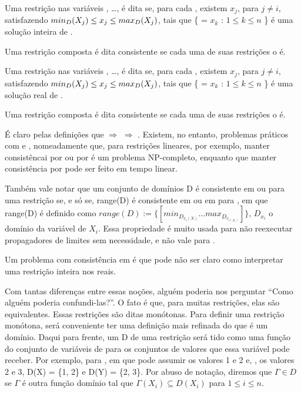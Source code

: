 \begin{definition}
  Uma restrição  nas variáveis , \dots,
   é dita  se, para cada
  , existem  $x_j$, para $j
  \neq i$, satisfazendo $min_D(\textit{$X_j$}) \leq x_j \leq
  max_D(\textit{$X_j$})$, tais que \{ = $x_k$ : $1 \leq k \leq
  n$ \} é uma solução inteira de .

  Uma restrição composta é dita \boundz{} consistente se cada uma de
  suas restrições o é.
\end{definition}

\begin{definition}
  Uma restrição  nas variáveis , \dots,
   é dita  se, para cada
  , existem  $x_j$, para $j \neq
  i$, satisfazendo $min_D(\textit{$X_j$}) \leq x_j \leq
  max_D(\textit{$X_j$})$, tais que \{ = $x_k$ : $1 \leq k \leq
  n$ \} é uma solução real de .

  Uma restrição composta é dita \boundr{} consistente se cada uma de
  suas restrições o é.
\end{definition}

É claro pelas definições que \boundd{} $\Rightarrow$ \boundz{}
$\Rightarrow$ \boundr. Existem, no entanto, problemas práticos com
\boundd{} e \boundz, nomeadamente que, para restrições lineares, por
exemplo, manter consistêncai por \boundd{} ou por \boundz{} é um
problema NP-completo, enquanto que manter consistência por \boundr{}
pode ser feito em tempo linear.

Também vale notar que um conjunto de domínios D é consistente em
\boundz{} ou \boundr{} para uma restrição  se, e só se,
range(D) é consistente em \boundz{} ou em \boundr{} para ,
em que range(D) é definido como $range(D) := \{[min_{D_{x_i(X)}} \ldots
  max_{D_{x_{i(X_i)}}}]\}$, $D_{x_i}$ o domínio da variável de 
$X_i$. Essa propriedade é muito usada para não reexecutar propagadores
de limites sem necessidade, e não vale para \boundd{}.

Um problema com consistência em \boundr{} é que pode não ser claro
como interpretar uma restrição inteira nos reais.

Com tantas diferenças entre essas noções, alguém poderia nos perguntar
``Como alguém poderia confundi-las?''. O fato é que, para muitas
restrições, elas são equivalentes. Essas restrições são ditas
monótonas. Para definir uma restrição monótona, será conveniente ter
uma definição mais refinada do que é um domínio. Daqui para frente, um
 D de uma restrição  será tido como uma
função do conjunto de variáveis de  para os conjuntos de
valores que essa variável pode receber. Por exemplo, para
, em que  pode assumir os valores 1 e
2 e, , os valores 2 e 3, D(X) = \{1, 2\} e D(Y) = \{2, 3\}. Por
abuso de notação, diremos que $\Gamma \in D$ se $\Gamma$ é outra
função domínio tal que $\Gamma(X_i) \subseteq D(X_i)$ para $1 \leq i
\leq n$.

